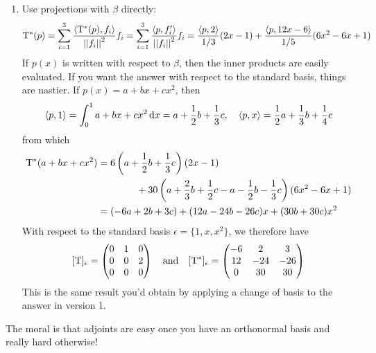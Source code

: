 \begin{example}{}{}
\begin{enumerate}
  \item Use projections with $\beta$ directly:
  \[\mathrm{T}^*(p)=\sum_{i=1}^3\frac{\left\langle \mathrm{T}^*(p),f_i\right\rangle}{\left| \left| f_i\right|\right|^2}f_i =\sum_{i=1}^3\frac{\left\langle p,f'_i\right\rangle}{\left| \left| f_i\right|\right|^2}f_i =\frac{\left\langle p,2\right\rangle}{1/3}(2x-1) +\frac{\left\langle p,12x-6\right\rangle}{1/5}(6x^2-6x+1)\]
  If $p(x)$ is written with respect to $\beta$, then the inner products are easily evaluated. If you want the answer with respect to the standard basis, things are nastier. If $p(x)=a+bx+cx^2$, then
  \[\left\langle p,1\right\rangle=\int_0^1a+bx+cx^2\,{\mathrm{d} x}=a+\frac 12b+\frac 13c,\quad \left\langle p,x\right\rangle=\frac 12a+\frac 13b+\frac 14c\]
 	from which
  \begin{align*}
  \mathrm{T}^*(a+bx+cx^2)&=6\left(a+\frac 12b+\frac 13c\right)(2x-1)\\
  &\qquad\qquad +30\left(a+\frac 23b+\frac 12c-a-\frac 12b-\frac 13c\right)(6x^2-6x+1)\\
  &=(-6a+2b+3c) +(12a-24b-26c)x+(30b+30c)x^2
  \end{align*}
  With respect to the standard basis $\epsilon=\{1,x,x^2\}$, we therefore have
  \[[\mathrm{T}]_\epsilon=\begin{pmatrix}
  0&1&0\\
  0&0&2\\
  0&0&0
  \end{pmatrix}\quad\text{and}\quad
  [\mathrm{T}^*]_\epsilon=\begin{pmatrix}
  -6&2&3\\
  12&-24&-26\\
  0&30&30
  \end{pmatrix}\]
  This is the same result you'd obtain by applying a change of basis to the answer in version 1.
\end{enumerate}
% 
% 
\end{example}
The moral is that adjoints are easy once you have an orthonormal basis and really hard otherwise! 

